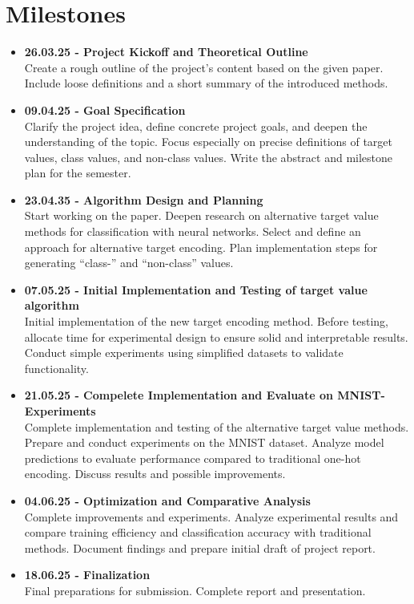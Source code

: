 \documentclass[12pt,fleqn,a4paper]{article}
\begin{document}
\section{Milestones} %
\begin{itemize}
\item {\textbf{26.03.25 - Project Kickoff and Theoretical Outline} \\ Create a rough outline of the project's content based on the given paper. Include loose definitions and a short summary of the introduced methods.}

\item{\textbf{09.04.25 - Goal Specification} \\ Clarify the project idea, define concrete project goals, and deepen the understanding of the topic. Focus especially on precise definitions of target values, class values, and non-class values. Write the abstract and milestone plan for the semester.}

\item{\textbf{23.04.35 - Algorithm Design and Planning} \\ Start working on the paper. Deepen research on alternative target value methods for classification with neural networks. Select and define an approach for alternative target encoding. Plan implementation steps for generating ``class-'' and ``non-class'' values.}

\item{\textbf{07.05.25 - Initial Implementation and Testing of target value algorithm} \\ Initial implementation of the new target encoding method.  Before testing, allocate time for experimental design to ensure solid and interpretable results. Conduct simple experiments using simplified datasets to validate functionality.}

\item{\textbf{21.05.25 - Compelete Implementation and Evaluate on MNIST-Experiments} \\ Complete implementation and testing of the alternative target value methods. Prepare and conduct experiments on the MNIST dataset. Analyze model predictions to evaluate performance compared to traditional one-hot encoding. Discuss results and possible improvements.}

\item{\textbf{04.06.25 - Optimization and Comparative Analysis} \\ Complete improvements and experiments. Analyze experimental results and compare training efficiency and classification accuracy with traditional methods. Document findings and prepare initial draft of project report.}

\item{\textbf{18.06.25 - Finalization} \\ Final preparations for submission. Complete report and presentation.}

\end{itemize}
\end{document}
